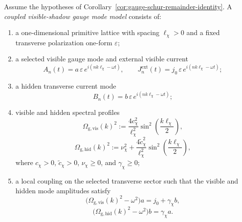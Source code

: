 \begin{definition}
\label{def:coupled-visible-shadow-gauge-mode-model}
Assume the hypotheses of
Corollary~\ref{cor:gauge-schur-remainder-identity}. A
\emph{coupled visible-shadow gauge mode model} consists of:
\begin{enumerate}[label=(\roman*),itemsep=0.2em]
\item a one-dimensional primitive lattice with spacing \(\ell_{\chi}>0\)
      and a fixed transverse polarization one-form \(\varepsilon\);
\item a selected visible gauge mode and external visible current
      \[
      A_n(t)=a\,\varepsilon\,e^{i(nk\ell_{\chi}-\omega t)},
      \qquad
      J_n^{\mathrm{ext}}(t)=j_0\,\varepsilon\,e^{i(nk\ell_{\chi}-\omega t)};
      \]
\item a hidden transverse current mode
      \[
      B_n(t)=b\,\varepsilon\,e^{i(nk\ell_{\chi}-\omega t)};
      \]
\item visible and hidden spectral profiles
      \[
      \Omega_{\mathrm{g,vis}}(k)^2
      :=
      \frac{4c_{\chi}^2}{\ell_{\chi}^2}
      \sin^2\!\left(\frac{k\ell_{\chi}}{2}\right),
      \]
      \[
      \Omega_{\mathrm{g,hid}}(k)^2
      :=
      \nu_{\chi}^2
      +
      \frac{4\widetilde c_{\chi}^2}{\ell_{\chi}^2}
      \sin^2\!\left(\frac{k\ell_{\chi}}{2}\right),
      \]
      where \(c_{\chi}>0\), \(\widetilde c_{\chi}>0\), \(\nu_{\chi}\ge 0\),
      and \(\gamma_{\chi}\ge 0\);
\item a local coupling on the selected transverse sector such that the visible
      and hidden mode amplitudes satisfy
      \[
      \bigl(\Omega_{\mathrm{g,vis}}(k)^2-\omega^2\bigr)a
      =
      j_0+\gamma_{\chi}b,
      \]
      \[
      \bigl(\Omega_{\mathrm{g,hid}}(k)^2-\omega^2\bigr)b
      =
      \gamma_{\chi}a.
      \]
\end{enumerate}
\end{definition}

